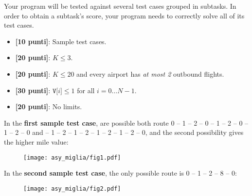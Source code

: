 \Scoring
Your program will be tested against several test cases grouped in subtasks.
In order to obtain a subtask's score, your program needs to correctly solve all of its test cases.

\begin{itemize}[nolistsep,itemsep=2mm]
  \item \textbf{ [10 punti]}: Sample test cases.
  \item \textbf{ [20 punti]}: $K \le 3$.
  \item \textbf{ [20 punti]}: $K \leq 20$ and every airport has \emph{at most 2} outbound flights.
  \item \textbf{ [30 punti]}: $\texttt{V[$i$]} \le 1$ for all $i=0\ldots N-1$.
  \item \textbf{ [20 punti]}: No limits.
\end{itemize}



\Examples
\begin{example}
%
%
\end{example}


\Explanation
In the \textbf{first sample test case}, are possible both route 0 -- 1 -- 2 -- 0 -- 1 -- 2 -- 0 -- 1 -- 2 -- 0 and  -- 1 -- 2 -- 1 -- 2 -- 1 -- 2 -- 1 -- 2 -- 0, and the second possibility gives the higher mile value:\\[2mm]
\begin{figure}[H]%
\centering\texttt{[image: asy\_miglia/fig1.pdf]}%
\end{figure}
In the \textbf{second sample test case}, the only possible route is 0 -- 1 -- 2 -- 8 -- 0:\\[2mm]
\begin{figure}[H]%
\centering\texttt{[image: asy\_miglia/fig2.pdf]}%
\end{figure}
